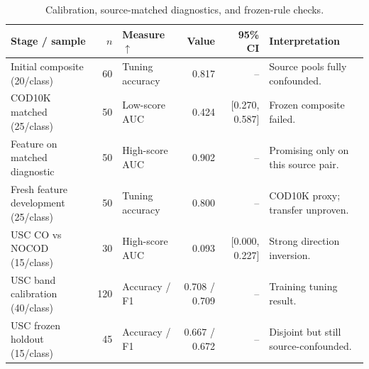 \begin{table}[htbp]
\centering
\caption{Calibration, source-matched diagnostics, and frozen-rule checks.}
\label{tab:calibration}
\small
\begin{tabularx}{\textwidth}{L{3.35cm}rL{2.0cm}rrY}
\toprule
\textbf{Stage / sample} & \textbf{$n$} & \textbf{Measure $\uparrow$} & \textbf{Value} & \textbf{95\% CI} & \textbf{Interpretation} \\
\midrule
Initial composite (20/class) & 60 & Tuning accuracy & 0.817 & -- & Source pools fully confounded. \\
COD10K matched (25/class) & 50 & Low-score AUC & 0.424 & [0.270, 0.587] & Frozen composite failed. \\
Feature on matched diagnostic & 50 & High-score AUC & 0.902 & -- & Promising only on this source pair. \\
Fresh feature development (25/class) & 50 & Tuning accuracy & 0.800 & -- & COD10K proxy; transfer unproven. \\
USC CO vs NOCOD (15/class) & 30 & High-score AUC & 0.093 & [0.000, 0.227] & Strong direction inversion. \\
USC band calibration (40/class) & 120 & Accuracy / F1 & 0.708 / 0.709 & -- & Training tuning result. \\
USC frozen holdout (15/class) & 45 & Accuracy / F1 & 0.667 / 0.672 & -- & Disjoint but still source-confounded. \\
\bottomrule
\end{tabularx}
\par{}
\end{table}
